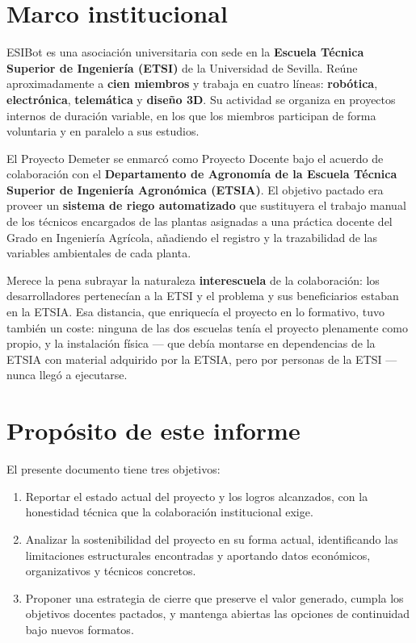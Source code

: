 \section{Marco institucional}

ESIBot es una asociaci\'on universitaria con sede en la
\textbf{Escuela T\'ecnica Superior de Ingenier\'ia (ETSI)} de la
Universidad de Sevilla. Re\'une aproximadamente a \textbf{cien miembros}
y trabaja en cuatro l\'ineas: \textbf{rob\'otica}, \textbf{electr\'onica},
\textbf{telem\'atica} y \textbf{dise\~no 3D}. Su actividad se organiza en
proyectos internos de duraci\'on variable, en los que los miembros
participan de forma voluntaria y en paralelo a sus estudios.

El Proyecto Demeter se enmarc\'o como Proyecto Docente bajo el acuerdo
de colaboraci\'on con el \textbf{Departamento de Agronom\'ia de la
Escuela T\'ecnica Superior de Ingenier\'ia Agron\'omica (ETSIA)}. El
objetivo pactado era proveer un \textbf{sistema de riego automatizado}
que sustituyera el trabajo manual de los t\'ecnicos encargados de las
plantas asignadas a una pr\'actica docente del Grado en Ingenier\'ia
Agr\'icola, a\~nadiendo el registro y la trazabilidad de las variables
ambientales de cada planta.

Merece la pena subrayar la naturaleza \textbf{interescuela} de la
colaboraci\'on: los desarrolladores pertenec\'ian a la ETSI y el problema
y sus beneficiarios estaban en la ETSIA. Esa distancia, que enriquec\'ia
el proyecto en lo formativo, tuvo tambi\'en un coste: ninguna de las dos
escuelas ten\'ia el proyecto plenamente como propio, y la instalaci\'on
f\'isica --- que deb\'ia montarse en dependencias de la ETSIA con material
adquirido por la ETSIA, pero por personas de la ETSI --- nunca lleg\'o a
ejecutarse.

\section{Prop\'osito de este informe}

El presente documento tiene tres objetivos:

\begin{enumerate}[leftmargin=*]
    \item Reportar el estado actual del proyecto y los logros alcanzados,
    con la honestidad t\'ecnica que la colaboraci\'on institucional exige.

    \item Analizar la sostenibilidad del proyecto en su forma actual,
    identificando las limitaciones estructurales encontradas y aportando
    datos econ\'omicos, organizativos y t\'ecnicos concretos.

    \item Proponer una estrategia de cierre que preserve el valor generado,
    cumpla los objetivos docentes pactados, y mantenga abiertas las
    opciones de continuidad bajo nuevos formatos.
\end{enumerate}

